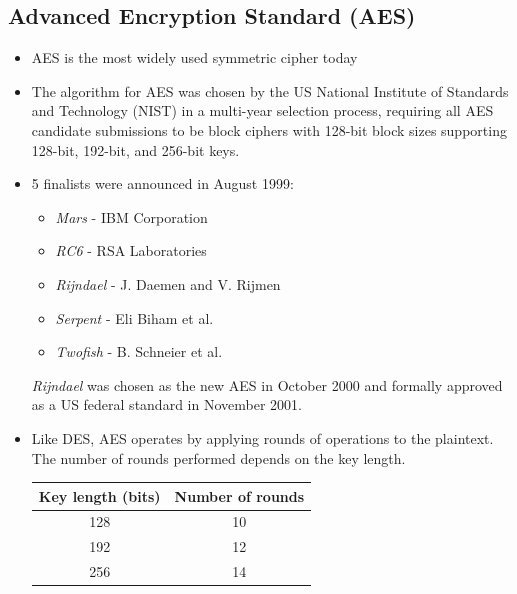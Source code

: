 \documentclass{math}
\begin{document}
\subsection*{Advanced Encryption Standard (AES)}
\begin{itemize}
  \item AES is the most widely used symmetric cipher today
  \item The algorithm for AES was chosen by the US National Institute of
  Standards and Technology (NIST) in a multi-year selection process, requiring
  all AES candidate submissions to be block ciphers with 128-bit block sizes
  supporting 128-bit, 192-bit, and 256-bit keys.
  \item 5 finalists were announced in August 1999:
  \begin{itemize}
    \item \textit{Mars} - IBM Corporation
    \item \textit{RC6} - RSA Laboratories
    \item \textit{Rijndael} - J. Daemen and V. Rijmen
    \item \textit{Serpent} - Eli Biham et al.
    \item \textit{Twofish} - B. Schneier et al.
  \end{itemize}
  \textit{Rijndael} was chosen as the new AES in October 2000 and formally
  approved as a US federal standard in November 2001.
  \item Like DES, AES operates by applying rounds of operations to the
  plaintext. The number of rounds performed depends on the key length.
  \begin{center}
    \begin{tabular}{|c|c|}
      \hline
      Key length (bits) & Number of rounds \\ \hline
      128 & 10 \\ \hline
      192 & 12 \\ \hline
      256 & 14 \\ \hline
    \end{tabular}
  \end{center}
\end{itemize}
\end{document}
